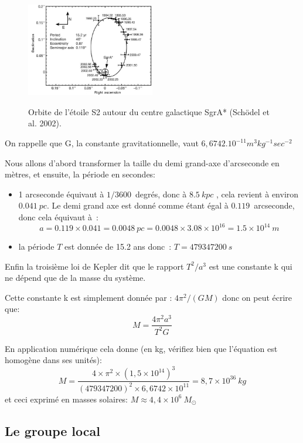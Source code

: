 \documentclass[a4paper,10pt]{report}
\begin{document}
\begin{figure}[htp]
  \centering
  \includegraphics[width=0.5\textwidth]{nature01121-f2_2}
  \label{centregalac}
  \caption{Orbite de l'étoile S2 autour du centre galactique SgrA*
    (Schödel et al. 2002).}
\end{figure}

\begin{Answer}
  On rappelle que G, la constante gravitationnelle, vaut
  $6,6742.10^{-11} m^3kg^{-1}sec^{-2}$

  Nous allons d'abord transformer la taille du demi grand-axe
  d'arcseconde en mètres, et ensuite, la période en secondes:
  \begin{itemize}
  \item 1 arcseconde équivaut à $1/3600$~degrés, donc à $8.5~kpc$ ,
    cela revient à environ $0.041~pc$. Le demi grand axe est donné
    comme étant égal à $0.119$~arcseconde, donc cela équivaut à~:
    $$
    a = 0.119\times0.041 = 0.0048~pc = 0.0048\times 3.08 \times
    10^{16} = 1.5 \times 10^{14}~m
    $$

  \item la période $T$ est donnée de 15.2 ans donc~: $T=479347200~s$
  \end{itemize}

  Enfin la troisième loi de Kepler dit que le rapport $T^2/a^3$ est une
  constante k qui ne dépend que de la masse du système.

  Cette constante k est simplement donnée par : $4\pi^2/(GM)$ donc on
  peut écrire que:
  $$
  M = \frac{4\pi^2 a^3}{T^2 G}
  $$

  En application numérique cela donne (en kg, vérifiez bien que
  l'équation est homogène dans ses unités):
  $$
  M = \frac{ 4 \times \pi^2 \times (1,5 \times 10^{14})^3 } { (479 347
    200)^2 \times 6,6742 \times 10^{11} } = 8,7 \times 10^{36}~kg
  $$
  et ceci exprimé en masses solaires: $M \approx 4,4 \times
  10^6~M_{\odot}$
\end{Answer}

\subsection{Le groupe local}
\end{document}
